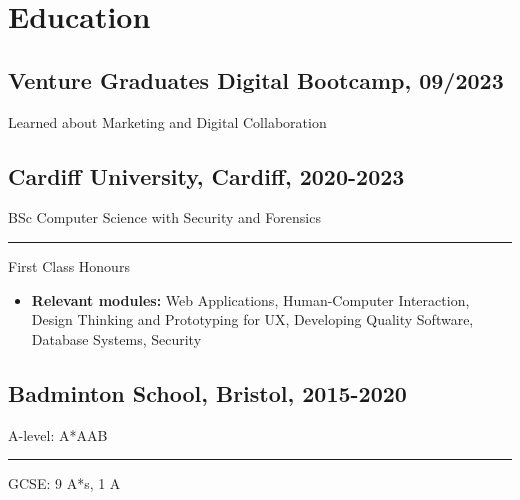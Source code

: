 \documentclass[11pt]{article}
\newcommand{\verticalline}[1][1pt]{\rule[-0.35ex]{#1}{0.9em}}
\begin{document}
    \section{Education}
    \subsection{Venture Graduates Digital Bootcamp, 09/2023}Learned about Marketing and Digital Collaboration 
    \subsection{Cardiff University, Cardiff, 2020-2023} 
    BSc Computer Science with Security and Forensics  \verticalline{} First Class Honours
    \begin{itemize}[itemsep=0pt, leftmargin=1em,topsep=-\parskip]
        \item \textbf{Relevant modules:} Web Applications, Human-Computer Interaction, Design Thinking and Prototyping for UX, Developing Quality Software, Database Systems, Security
    \end{itemize}
    \subsection{Badminton School, Bristol, 2015-2020}
    A-level: A*AAB \verticalline{}  GCSE: 9 A*s, 1 A 
\end{document}

